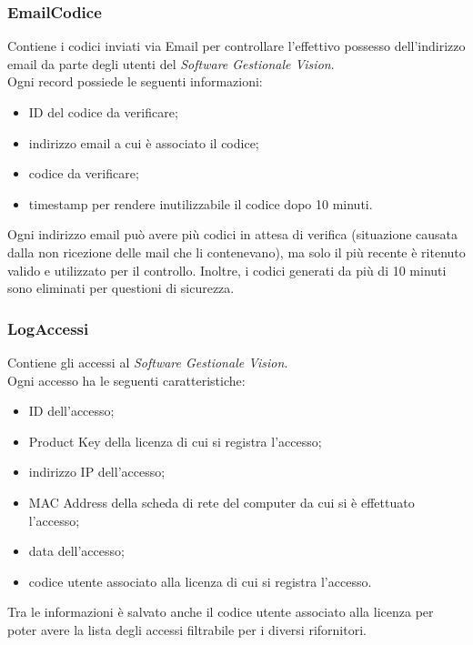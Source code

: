 \subsubsection{EmailCodice}

Contiene i codici inviati via Email per controllare l’effettivo possesso dell’indirizzo email da parte degli utenti del \textit{Software Gestionale Vision}.
\\Ogni record possiede le seguenti informazioni:

\begin{itemize}
\item ID del codice da verificare;
\item indirizzo email a cui è associato il codice;
\item codice da verificare;
\item timestamp per rendere inutilizzabile il codice dopo 10 minuti.
\end{itemize}

Ogni indirizzo email può avere più codici in attesa di verifica (situazione causata dalla non ricezione delle mail che li contenevano), ma solo il più recente è ritenuto valido e utilizzato per il controllo. Inoltre, i codici generati da più di 10 minuti sono eliminati per questioni di sicurezza.

\subsubsection{LogAccessi}

Contiene gli accessi al \textit{Software Gestionale Vision}.
\\Ogni accesso ha le seguenti caratteristiche:

\begin{itemize}
\item ID dell'accesso;
\item Product Key della licenza di cui si registra l'accesso;
\item indirizzo IP dell'accesso;
\item MAC Address della scheda di rete del computer da cui si è effettuato l'accesso;
\item data dell'accesso;
\item codice utente associato alla licenza di cui si registra l'accesso.
\end{itemize}

Tra le informazioni è salvato anche il codice utente associato alla licenza per poter avere la lista degli accessi filtrabile per i diversi rifornitori.

